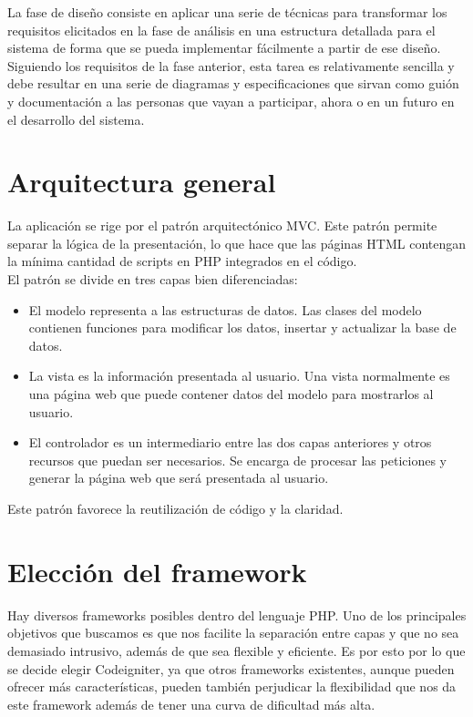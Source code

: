 La fase de diseño consiste en aplicar una serie de técnicas para transformar los requisitos elicitados en la fase de análisis en una estructura detallada para el sistema de forma que se pueda implementar fácilmente a partir de ese diseño.\\

Siguiendo los requisitos de la fase anterior, esta tarea es relativamente sencilla y debe resultar en una serie de diagramas y especificaciones que sirvan como guión y documentación a las personas que vayan a participar, ahora o en un futuro en el desarrollo del sistema.\\

\section{Arquitectura general}

La aplicación se rige por el patrón arquitectónico MVC. Este patrón permite separar la lógica de la presentación, lo que hace que las páginas HTML contengan la mínima cantidad de scripts en PHP integrados en el código.
\\
El patrón se divide en tres capas bien diferenciadas:

\begin{itemize}
\item El modelo representa a las estructuras de datos. Las clases del modelo contienen funciones para modificar los datos, insertar y actualizar la base de datos. 
\item La vista es la información presentada al usuario. Una vista normalmente es una página web que puede contener datos del modelo para mostrarlos al usuario.
\item El controlador es un intermediario entre las dos capas anteriores y otros recursos que puedan ser necesarios. Se encarga de procesar las peticiones y generar la página web que será presentada al usuario.
\end{itemize}

Este patrón favorece la reutilización de código y la claridad.

\section{Elección del framework}

Hay diversos frameworks posibles dentro del lenguaje PHP. Uno de los principales objetivos que buscamos es que nos facilite la separación entre capas y que no sea demasiado intrusivo, además de que sea flexible y eficiente. Es por esto por lo que se decide elegir Codeigniter, ya que otros frameworks existentes, aunque pueden ofrecer más características, pueden también perjudicar la flexibilidad que nos da este framework además de tener una curva de dificultad más alta.


